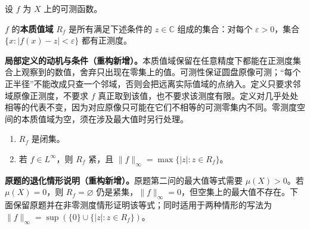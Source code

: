 \documentclass[../../main.tex]{subfiles}
\begin{document}
\begin{exercise}\label{exercise:ch06-essential-range}
设 $f$ 为 $X$ 上的可测函数。
\begin{definition*}[本质值域]\label{definition:ch06-essential-range-local}
$f$ 的\textbf{本质值域} $R_f$ 是所有满足下述条件的 $z\in\mathbb C$ 组成的集合：对每个 $\varepsilon>0$，集合 $\{x:|f(x)-z|<\varepsilon\}$ 都有正测度。
\end{definition*}
\begin{remark}
\textbf{局部定义的动机与条件（重构新增）。}本质值域保留在任意精度下都能在正测度集合上观察到的数值，舍弃只出现在零集上的值。可测性保证圆盘原像可测；“每个正半径”不能改成只查一个邻域，否则会把远离实际值域的点纳入。定义只要求邻域原像正测度，不要求 $f$ 真正取到该值，也不要求该测度有限。定义对几乎处处相等的代表不变，因为对应原像只可能在它们不相等的可测零集内不同。零测度空间的本质值域为空，须在涉及最大值时另行处理。
\end{remark}
\begin{enumerate}
\item\label{item:ch06-essential-range-closed} $R_f$ 是闭集。
\item\label{item:ch06-essential-range-compact} 若 $f\in L^\infty$，则 $R_f$ 紧，且 $\|f\|_\infty=\max\{|z|:z\in R_f\}$。
\end{enumerate}
\end{exercise}
\begin{remark}
\textbf{原题的退化情形说明（重构新增）。}原题第二问的最大值等式需要 $\mu(X)>0$。若 $\mu(X)=0$，则 $R_f=\varnothing$ 仍是紧集，$\|f\|_\infty=0$，但空集上的最大值不存在。下面保留原题并在非零测度情形证明该等式；同时适用于两种情形的写法为 $\|f\|_\infty=\sup(\{0\}\cup\{|z|:z\in R_f\})$。
\end{remark}
\end{document}
